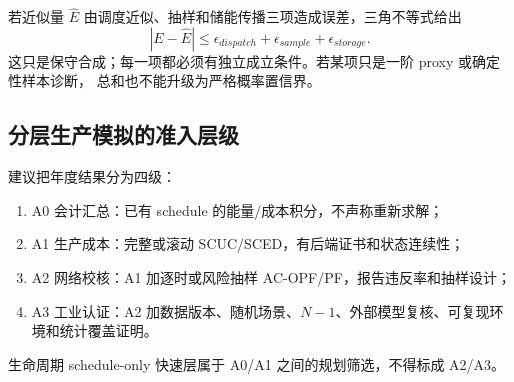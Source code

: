 若近似量 $\widehat E$ 由调度近似、抽样和储能传播三项造成误差，三角不等式给出
\begin{equation}
|E-\widehat E|\le\epsilon_{dispatch}+\epsilon_{sample}+\epsilon_{storage}.
\label{eq:ts-error-sum}
\end{equation}
这只是保守合成；每一项都必须有独立成立条件。若某项只是一阶 proxy 或确定性样本诊断，
总和也不能升级为严格概率置信界。

\subsection{分层生产模拟的准入层级}
建议把年度结果分为四级：
\begin{enumerate}
\item A0 会计汇总：已有 schedule 的能量/成本积分，不声称重新求解；
\item A1 生产成本：完整或滚动 SCUC/SCED，有后端证书和状态连续性；
\item A2 网络校核：A1 加逐时或风险抽样 AC-OPF/PF，报告违反率和抽样设计；
\item A3 工业认证：A2 加数据版本、随机场景、$N-1$、外部模型复核、可复现环境和统计覆盖证明。
\end{enumerate}
生命周期 schedule-only 快速层属于 A0/A1 之间的规划筛选，不得标成 A2/A3。

